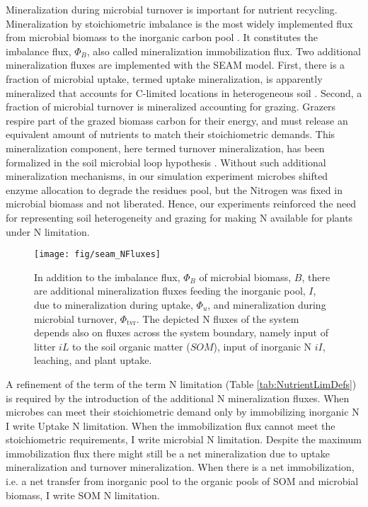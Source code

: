 Mineralization during microbial turnover is important for nutrient recycling.
Mineralization by stoichiometric imbalance is the most widely implemented flux
from microbial biomass to the inorganic carbon pool \citep{Manzoni09}. It
constitutes the imbalance flux, $\Phi_B$, also called mineralization
immobilization flux.
Two additional mineralization fluxes are implemented with the SEAM model.
First, there is a fraction of microbial uptake, termed uptake mineralization, is
apparently mineralized that accounts for C-limited locations in heterogeneous
soil \citep{Manzoni08}.
Second, a fraction of microbial turnover is mineralized accounting for grazing.
Grazers respire part of the grazed biomass carbon for their energy, and must
release an equivalent amount of nutrients to match their stoichiometric demands.
This mineralization component, here termed turnover mineralization, has been
formalized in the soil microbial loop hypothesis \citep{Clarholm85, Raynaud06}.
Without such additional mineralization mechanisms, in our simulation experiment
microbes shifted enzyme allocation to degrade the residues pool, but the
Nitrogen was fixed in microbial biomass and not liberated. Hence, our
experiments reinforced the need for representing soil heterogeneity and grazing
for making N available for plants under N limitation.

\begin{figure}[t] \vspace*{2mm}
\begin{center}
\texttt{[image: fig/seam\_NFluxes]} 
\end{center}
\caption{
In addition to the imbalance flux, $\Phi_B$ of microbial biomass, $B$, there are
additional mineralization fluxes feeding the inorganic pool, $I$, due to
mineralization during uptake, $\Phi_u$, and mineralization 
during microbial turnover, $\Phi_{\operatorname{tvr}}$. The depicted N
fluxes of the system depends also on fluxes across the system boundary,
namely input of litter $iL$ to the soil organic matter ($SOM$), input of inorganic N $iI$, leaching, and
plant uptake.
\label{fig:seamNFluxes}}
\end{figure}

A refinement of the term of the term N limitation (Table
\ref{tab:NutrientLimDefs}) is required by the introduction of the additional N
mineralization fluxes.
When microbes can meet their stoichiometric demand only by immobilizing
inorganic N I write Uptake N limitation.
When the immobilization flux cannot meet the stoichiometric requirements, I
write microbial N limitation. Despite the maximum immobilization flux there
might still be a net mineralization due to uptake mineralization and turnover
mineralization.
When there is a net immobilization, i.e. a net transfer from inorganic pool to
the organic pools of SOM and microbial biomass, I write SOM N limitation.

